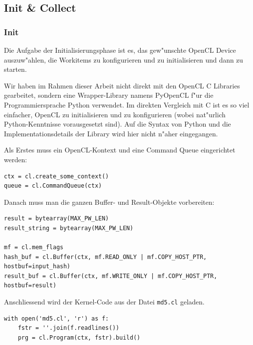 \begin{refsection}
\subsection{Init \& Collect}

\subsubsection{Init}

Die Aufgabe der Initialisierungsphase ist es, das gew"unschte OpenCL Device
auszuw"ahlen, die Workitems zu konfigurieren und zu initialisieren und dann zu
starten.

Wir haben im Rahmen dieser Arbeit nicht direkt mit den OpenCL C Libraries
gearbeitet, sondern eine Wrapper-Library namens
PyOpenCL\cite{crypto:pyopencl_docs} f"ur die Programmiersprache
Python\cite{crypto:python} verwendet. Im direkten Vergleich mit C ist es so viel
einfacher, OpenCL zu initialisieren und zu konfigurieren (wobei nat"urlich
Python-Kenntnisse vorausgesetzt sind). Auf die Syntax von Python und die
Implementationsdetails der Library wird hier nicht n"aher eingegangen.

Als Erstes muss ein OpenCL-Kontext und eine Command Queue eingerichtet werden:

\begin{small}
\begin{verbatim}
ctx = cl.create_some_context()
queue = cl.CommandQueue(ctx)
\end{verbatim}
\end{small}

\noindent Danach muss man die ganzen Buffer- und Result-Objekte vorbereiten:

\begin{small}
\begin{verbatim}
result = bytearray(MAX_PW_LEN)
result_string = bytearray(MAX_PW_LEN)

mf = cl.mem_flags
hash_buf = cl.Buffer(ctx, mf.READ_ONLY | mf.COPY_HOST_PTR, hostbuf=input_hash)
result_buf = cl.Buffer(ctx, mf.WRITE_ONLY | mf.COPY_HOST_PTR, hostbuf=result)
\end{verbatim}
\end{small}

\noindent Anschliessend wird der Kernel-Code aus der Datei \texttt{md5.cl}
geladen.

\begin{small}
\begin{verbatim}
with open('md5.cl', 'r') as f:
    fstr = ''.join(f.readlines())
    prg = cl.Program(ctx, fstr).build()
\end{verbatim}
\end{small}


\end{refsection}
